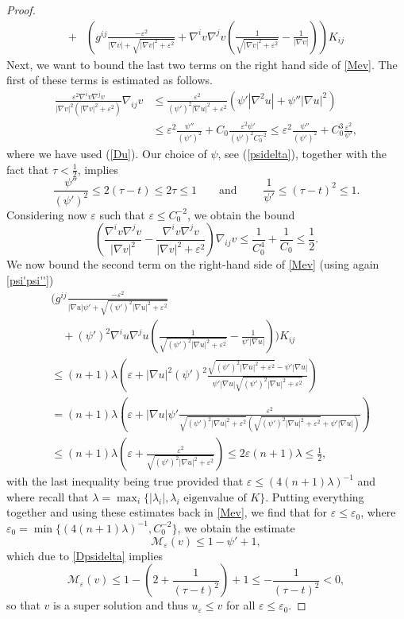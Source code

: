 \documentclass[11pt]{amsart}
\renewcommand{\epsilon}{\varepsilon}
\def\e{\epsilon}
\def\t{\tau}
\def\l{\lambda}
\begin{document}
\begin{proof}
\begin{equation}
\begin{split}
+&\left(g^{ij}\frac{-\e^2}{|\nabla v|+\sqrt{|\nabla v|^2+\e^2}} +\nabla^iv\nabla^jv\left(\frac{1}{\sqrt{|\nabla v|^2+\e^2}}-\frac{1}{|\nabla v|} \right)\right)K_{ij}
\end{split}\end{equation}
Next, we want to bound the last two terms on the right hand side of \eqref{Mev}. The first of these terms is estimated as follows.
\begin{equation*}\begin{split}
\frac{\e^2\nabla^iv\nabla^jv}{|\nabla v|^2(|\nabla v|^2+\e^2)}\nabla_{ij}v&\le\frac{\e^2}{(\psi')^2|\nabla u|^2+\e^2}(\psi'|\nabla^2u|+\psi''|\nabla u|^2)\\
&\le\e^2\frac{\psi''}{(\psi')^2}+C_0\frac{\e^2\psi'}{(\psi')^2 C_0^{-2}}\le \e^2\frac{\psi''}{(\psi')^2}+C_0^3\frac{\e^2}{\psi'},
\end{split}
\end{equation*}
where we have used (\ref{Du}). Our choice of $\psi$, see (\ref{psidelta}), together with the fact that $\tau<\frac{1}{2}$,  implies
\begin{equation}\label{psi'psi''}
\frac{\psi''}{(\psi')^2}\le2(\t-t)\le2\t\le 1\quad\quad\text{and }\quad\quad\frac{1}{\psi'}\le (\t-t)^2\le1.
\end{equation}
Considering now $\e$ such that $\e\le  C_0^{-2}$, we  obtain the  bound
\[\left(\frac{\nabla^i v\nabla^j v}{|\nabla v|^2}-\frac{\nabla^i v\nabla^j v}{|\nabla v|^2+\e^2}\right)\nabla_{ij}v
\le\frac{1}{C_0^4}+ \frac{1}{C_0}\le \frac{1}{2}.\]
We now bound the second term on the right-hand side of \eqref{Mev} (using again \eqref{psi'psi''})
\[\begin{split}
 &\Biggl(g^{ij}\frac{-\e^2}{|\nabla u|\psi'+\sqrt{(\psi')^2|\nabla u|^2+\e^2}} \\
 &\quad+(\psi')^2\nabla^iu\nabla^ju\left(\frac{1}{\sqrt{(\psi')^2|\nabla u|^2+\e^2}}-\frac{1}{\psi'|\nabla u|} \right)\Biggr)K_{ij}\\
 &\le (n+1)\lambda \left(\e+ |\nabla u|^2(\psi')^2 \frac{\sqrt{(\psi')^2|\nabla u|^2+\e^2}-\psi'|\nabla u|}{\psi'|\nabla u|\sqrt{(\psi')^2|\nabla u|^2+\e^2}}\right)\\
 &= (n+1)\lambda \left(\e+ |\nabla u|\psi' \frac{\e^2}{\sqrt{(\psi')^2|\nabla u|^2+\e^2}(\sqrt{(\psi')^2|\nabla u|^2+\e^2}+\psi'|\nabla u|)}\right)\\
 &\le (n+1)\lambda \left(\e+ \frac{\e^2}{\sqrt{(\psi')^2|\nabla u|^2+\e^2}}\right)\le 2\e(n+1)\lambda \le \frac1 2,
\end{split}\]
with the last inequality being true provided that $\e\le (4(n+1)\lambda)^{-1}$ and  where recall that $\lambda=\max_i\{|\l_i|, \l_i\text{  eigenvalue of  } K\}$. Putting everything together and using these estimates back in \eqref{Mev},  we find that for $\e\le \e_0$, where $\e_0=\min\{(4(n+1)\lambda)^{-1}, C_0^{-2}\}$, we obtain the estimate
\[\mathcal M_\e(v) \le 1-\psi' +{1},\]
which due to \eqref{Dpsidelta} implies
\[
\mathcal M_\e(v) \le 1-\left(2+\frac{1}{(\t-t)^2}\right) +{1}\le-\frac{1}{(\t-t)^2}<0,
\]
so that $v$ is a super solution and thus $u_\e\le v$ for all $\e\le \e_0$.
\end{proof}
\end{document}

